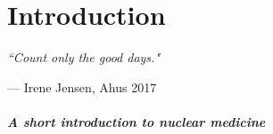 \documentclass[twoside,english]{uiofysmaster/uiofysmaster}
\begin{document}
\chapter{Introduction}

\epigraph{\itshape ``Count only the good days."}{--- \textup{ Irene Jensen}, Ahus 2017}
 









\paragraph{A short introduction to nuclear medicine} \mbox{}




\end{document}
